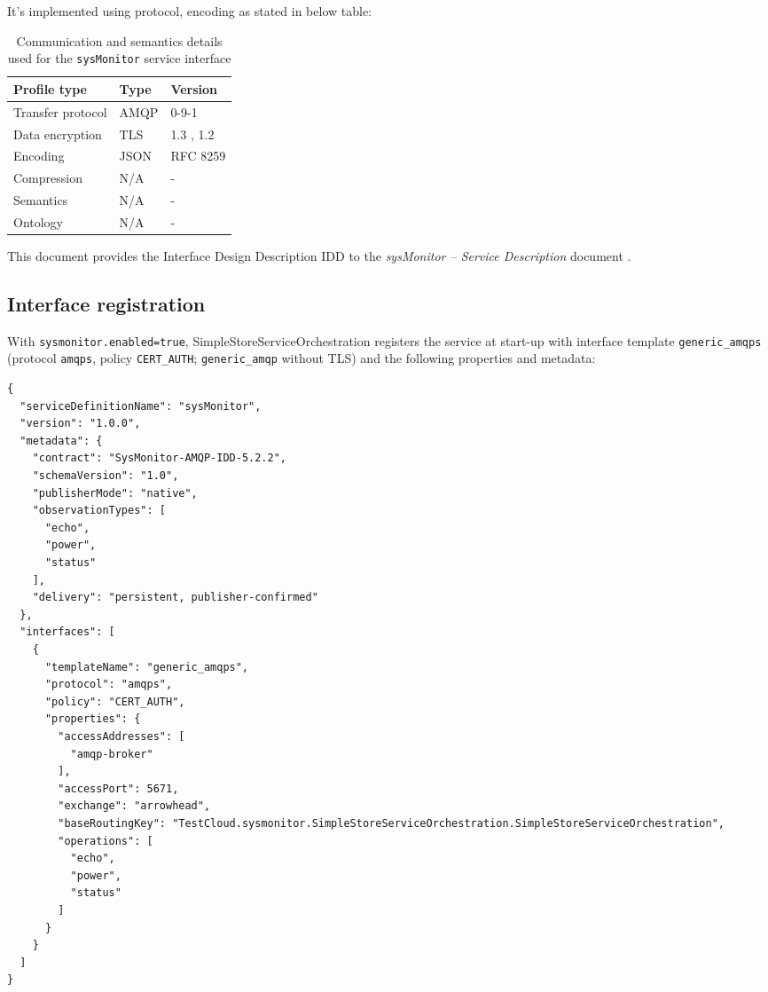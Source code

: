 \documentclass[a4paper]{arrowhead}
\begin{document}
It's implemented using protocol, encoding as stated in below table:
\begin{table}[ht!]
  \centering
  \begin{tabular}{|l|l|l|}
    \hline
    \rowcolor{gray!33} Profile type & Type & Version \\ \hline
    Transfer protocol & AMQP & 0-9-1 \cite{amqp091} \\ \hline
    Data encryption & TLS & 1.3 \cite{rfc8446}, 1.2 \cite{rfc5246} \\ \hline
    Encoding & JSON & RFC 8259 \cite{rfc8259} \\ \hline
    Compression & N/A & - \\ \hline
    Semantics & N/A & - \\ \hline
    Ontology & N/A & - \\ \hline
  \end{tabular}
  \caption{Communication and semantics details used for the \texttt{sysMonitor} service interface}
  \label{tab:comunication_semantics_profile}
\end{table}

This document provides the Interface Design Description IDD to the \textit{sysMonitor -- Service Description} document \cite{ssso-sysMonitor-sd}.

\subsection{Interface registration}

With \texttt{sysmonitor.enabled=true}, SimpleStoreServiceOrchestration registers the service at start-up with interface template \texttt{generic\_\allowbreak{}amqps} (protocol \texttt{amqps}, policy \texttt{CERT\_\allowbreak{}AUTH}; \texttt{generic\_\allowbreak{}amqp} without TLS) and the following properties and metadata:

\begin{lstlisting}[caption={Registered service instance (TestCloud).}]
{
  "serviceDefinitionName": "sysMonitor",
  "version": "1.0.0",
  "metadata": {
    "contract": "SysMonitor-AMQP-IDD-5.2.2",
    "schemaVersion": "1.0",
    "publisherMode": "native",
    "observationTypes": [
      "echo",
      "power",
      "status"
    ],
    "delivery": "persistent, publisher-confirmed"
  },
  "interfaces": [
    {
      "templateName": "generic_amqps",
      "protocol": "amqps",
      "policy": "CERT_AUTH",
      "properties": {
        "accessAddresses": [
          "amqp-broker"
        ],
        "accessPort": 5671,
        "exchange": "arrowhead",
        "baseRoutingKey": "TestCloud.sysmonitor.SimpleStoreServiceOrchestration.SimpleStoreServiceOrchestration",
        "operations": [
          "echo",
          "power",
          "status"
        ]
      }
    }
  ]
}
\end{lstlisting}
\end{document}
